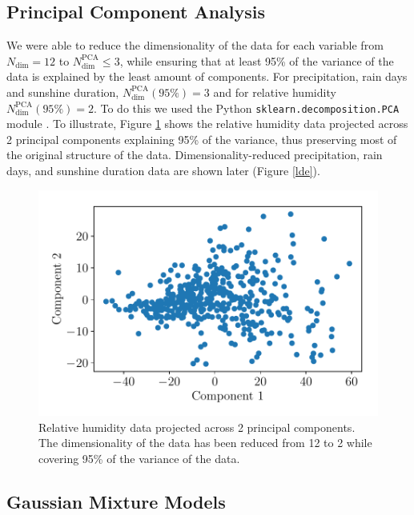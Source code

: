 \documentclass[a4paper,fleqn,usenatbib]{mnras}
\begin{document}
\subsection{Principal Component Analysis}

We were able to reduce the dimensionality of the data for each variable from  $N_\mathrm{dim}=12$ to  $N_\mathrm{dim}^\mathrm{PCA}\le3$, while ensuring that at least 95\% of the variance of the data is explained by the least amount of components. For precipitation, rain days and sunshine duration, $N_\mathrm{dim}^\mathrm{PCA}(95\%)=3$ and for relative humidity $N_\mathrm{dim}^\mathrm{PCA}(95\%)=2$. To do this we used the Python \texttt{sklearn.decomposition.PCA} module \citep{sklearn}. To illustrate, Figure \ref{pcah} shows the relative humidity data projected across 2 principal components explaining 95\% of the variance, thus preserving most of the original structure of the data. Dimensionality-reduced precipitation, rain days, and sunshine duration data are shown later (Figure \ref{lde}).

\begin{figure}
\begin{center}
\includegraphics[width=\columnwidth]{pcah.pdf}
\caption{Relative humidity data projected across 2 principal components. The dimensionality of the data has been reduced from 12 to 2 while covering 95\% of the variance of the data. }\label{pcah}
\end{center}
\end{figure}

\subsection{Gaussian Mixture Models}
\end{document}
